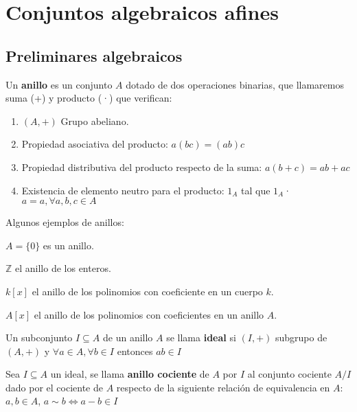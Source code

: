 \chapter{Conjuntos algebraicos afines}

\section{Preliminares algebraicos}
\begin{Def}
Un \textbf{anillo} es un conjunto $A$ dotado de dos operaciones binarias, que llamaremos suma (+)  y producto (·) que verifican:

\begin{enumerate}
\item $(A,+)$ Grupo abeliano.
\item Propiedad asociativa del producto:  $a(bc)=(ab)c$
\item Propiedad distributiva del producto respecto de la suma: 
$a(b+c)=ab+ac$
\item Existencia de elemento neutro para el producto: $1_A$ tal que $1_A$·$a=a, \forall a,b,c \in A$
\end{enumerate}
\end{Def}
Algunos ejemplos de anillos:

\begin{itemize*}
\item $A=\{ 0 \}$ es un anillo.
\item $\mathbb{Z}$ el anillo de los enteros.
\item $k[x]$ el anillo de los polinomios con coeficiente en un cuerpo $k$.
\item $A[x]$ el anillo de los polinomios con coeficientes en un anillo $A$.
\end{itemize*}

\begin{Def}
Un subconjunto $I\subseteq A$ de un anillo $A$ se llama \textbf{ideal} si $(I,+)$ subgrupo de $(A,+)$ y $\forall a\in A, \forall b \in I$ entonces $ab\in I$
\end{Def}


\begin{Def}
Sea $I\subseteq A$ un ideal, se llama \textbf{anillo cociente} de $A$ por $I$ al conjunto cociente $A/I$ dado por el cociente de $A$ respecto de la siguiente relación de equivalencia en $A$: $a,b\in A$, $a \sim b \Leftrightarrow a-b \in I$
\end{Def}

